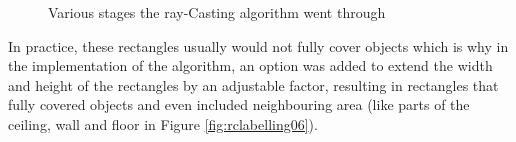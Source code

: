 \begin{figure}[htp]
{    }\quad
    \quad%
    \quad
    \caption{Various stages the ray-Casting algorithm went through}
    \label{fig:rc-labelling}
\end{figure}
In practice, these rectangles usually would not fully cover objects which is why in the implementation of the algorithm, an option was added to extend the width and height of the rectangles by an adjustable factor, resulting in rectangles that fully covered objects and even included neighbouring area (like parts of the ceiling, wall and floor in Figure \ref{fig:rclabelling06}).\\
